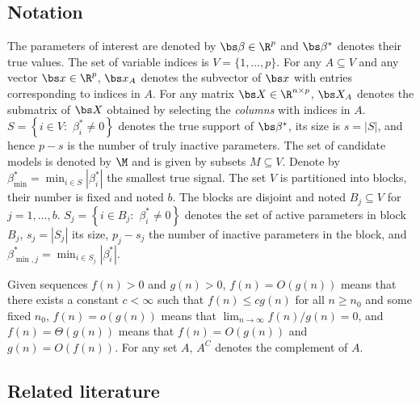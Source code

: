 \documentclass{article}
\begin{document}
\subsection{Notation}

The parameters of interest are denoted by $\bs \beta\in \R^p$  
and $\bs \beta^*$ denotes their true values. The set of variable indices is $V=\{1,\ldots,p\}$. For any $A\subseteq V$ and any vector $\bs x\in \R^p$, $\bs x_A$ denotes the subvector of $\bs x$ with entries corresponding to indices in $A$. For any matrix $\bs X \in \R^{n\times p}$, $\bs X_A$ denotes the submatrix of $\bs X$ obtained by selecting the \emph{columns} with indices in $A$. $S=\left\{i\in V:\,\,  \beta^*_i \neq 0 \right\}$ denotes the true support of $\bs \beta^*$, its size is $s=|S|$, and hence $p-s$ is the number of truly inactive parameters. The set of candidate models is denoted by $\M$ and is given by subsets $M\subseteq V$. Denote by $\beta_{\min}^*=\min_{i \in S}|\beta^*_i|$ the smallest true signal. The set $V$ is partitioned into blocks, their number is fixed and noted $b$. The blocks are disjoint and noted $B_j \subseteq V$ for $j=1,\ldots,b$. $S_j=\left\{i\in B_j:\,\,  \beta^*_i \neq 0\right\}$ denotes the set of active parameters in block $B_j$, $s_j=|S_j|$ its size, $p_j-s_j$ the number of inactive parameters in the block,
and $\beta_{\min,j}^*=\min_{i \in S_j}|\beta^*_i|$.

Given sequences $f(n) > 0$ and $g(n) >0$, $f(n)=O(g(n))$ means that there exists a constant $c<\infty$ such that $f(n) \leq c g(n)$ for all $n \geq n_0$ and some fixed $n_0$, $f(n)=o(g(n))$ means that $\lim_{n\to\infty}f(n)/g(n)=0$, and $f(n)=\Theta(g(n))$ means that $f(n) = O(g(n))$ and $g(n) = O(f(n))$. For any set $A$, $A^C$ denotes the complement of $A$.

\subsection{Related literature}
\end{document}
